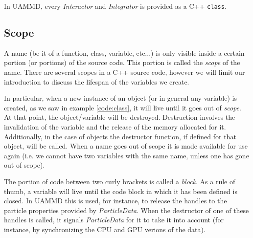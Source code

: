 \documentclass[ twoside,openright,titlepage,numbers=noenddot,%
headinclude,footinclude,cleardoublepage=empty,abstract=on,
BCOR=5mm,paper=a4,fontsize=11pt, dvipsnames
]{scrreprt}
\def\ucpp{uammd_cpp_lexer.py:UAMMDCppLexer -x}
\newcommand{\uammd}{\gls{UAMMD}\xspace}
\newcommand{\gpu}{\gls{GPU}\xspace}
\begin{document}
In \uammd, every \emph{Interactor} and \emph{Integrator} is provided as a C++ \texttt{class}.

\subsection*{Scope}
A name (be it of a function, class, variable, etc...) is only visible inside a certain portion (or portions) of the source code. This portion is called the \emph{scope} of the name. There are several scopes in a C++ source code, however we will limit our introduction to discuss the lifespan of the variables we create.

In particular, when a new instance of an object (or in general any variable) is created, as we saw in example \ref{code:class}, it will live until it goes out of \emph{scope}. At that point, the object/variable will be destroyed.
Destruction involves the invalidation of the variable and the release of the memory allocated for it. Additionally, in the case of objects the destructor function, if defined for that object, will be called. When a name goes out of scope it is made available for use again (i.e. we cannot have two variables with the same name, unless one has gone out of scope).

The portion of code between two curly brackets is called a \emph{block}. As a rule of thumb, a variable will live until the code block in which it has been defined is closed. In \uammd this is used, for instance, to release the handles to the particle properties provided by \emph{ParticleData}. When the destructor of one of these handles is called, it signals \emph{ParticleData} for it to take it into account (for instance, by synchronizing the CPU and \gpu verions of the data).
\end{document}
